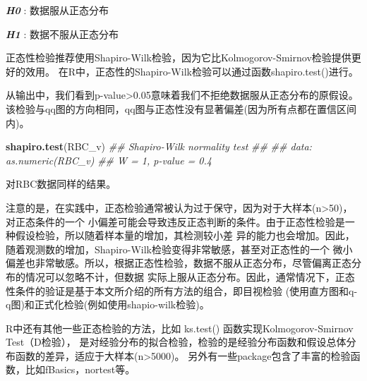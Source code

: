 \documentclass[
]{article}
\newenvironment{Shaded}{\begin{snugshade}}{\end{snugshade}}
\newcommand{\CommentTok}[1]{\textcolor[rgb]{0.56,0.35,0.01}{\textit{#1}}}
\newcommand{\DataTypeTok}[1]{\textcolor[rgb]{0.13,0.29,0.53}{#1}}
\newcommand{\DecValTok}[1]{\textcolor[rgb]{0.00,0.00,0.81}{#1}}
\newcommand{\KeywordTok}[1]{\textcolor[rgb]{0.13,0.29,0.53}{\textbf{#1}}}
\newcommand{\NormalTok}[1]{#1}
\newcommand{\OperatorTok}[1]{\textcolor[rgb]{0.81,0.36,0.00}{\textbf{#1}}}
\newcommand{\StringTok}[1]{\textcolor[rgb]{0.31,0.60,0.02}{#1}}
\begin{document}
\textbf{\emph{H0}} : 数据服从正态分布

\textbf{\emph{H1}} : 数据不服从正态分布

正态性检验推荐使用Shapiro-Wilk检验，因为它比Kolmogorov-Smirnov检验提供更好的效用。
在R中，正态性的Shapiro-Wilk检验可以通过函数shapiro.test()进行。

\begin{Shaded}
\end{Shaded}

从输出中，我们看到p-value\textgreater0.05意味着我们不拒绝数据服从正态分布的原假设。
该检验与qq图的方向相同，qq图与正态性没有显著偏差(因为所有点都在置信区间内)。

\begin{Shaded}
\begin{Highlighting}[]
\KeywordTok{shapiro.test}\NormalTok{(RBC_v)}
\CommentTok{##      Shapiro-Wilk normality test}
\CommentTok{##  }
\CommentTok{##  data:  as.numeric(RBC_v)}
\CommentTok{##  W = 1, p-value = 0.4}
\end{Highlighting}
\end{Shaded}

对RBC数据同样的结果。

注意的是，在实践中，正态检验通常被认为过于保守，因为对于大样本(n\textgreater50)，对正态条件的一个
小偏差可能会导致违反正态判断的条件。由于正态性检验是一种假设检验，所以随着样本量的增加，其检测较小差
异的能力也会增加。因此，随着观测数的增加，Shapiro-Wilk检验变得非常敏感，甚至对正态性的一个
微小偏差也非常敏感。所以，根据正态性检验，数据不服从正态分布，尽管偏离正态分布的情况可以忽略不计，但数据
实际上服从正态分布。因此，通常情况下，正态性条件的验证是基于本文所介绍的所有方法的组合，即目视检验
(使用直方图和q-q图)和正式化检验(例如使用shapio-wilk检验)。

R中还有其他一些正态检验的方法，比如 ks.test() 函数实现Kolmogorov-Smirnov Test（D检验），
是对经验分布的拟合检验，检验的是经验分布函数和假设总体分布函数的差异，适应于大样本(n\textgreater5000)。
另外有一些package包含了丰富的检验函数，比如fBasics，nortest等。
\end{document}
